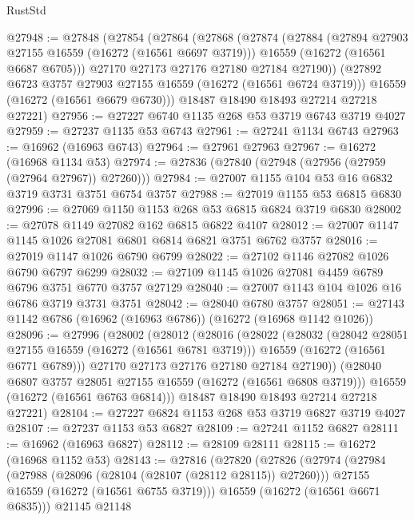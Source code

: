 \begin{lexlean}{RustStd}
\begin{coremodule}
@27948 := @27848
    (@27854
      (@27864
        (@27868
          (@27874
            (@27884
              (@27894 @27903 @27155 @16559 (@16272 (@16561 @6697 @3719)))
              @16559
              (@16272 (@16561 @6687 @6705)))
            @27170
            @27173
            @27176
            @27180
            @27184
            @27190))
        (@27892 @6723 @3757 @27903 @27155 @16559 (@16272 (@16561 @6724 @3719)))
        @16559
        (@16272 (@16561 @6679 @6730)))
      @18487
      @18490
      @18493
      @27214
      @27218
      @27221)
@27956 := @27227 @6740 @1135 @268 @53 @3719 @6743 @3719 @4027
@27959 := @27237 @1135 @53 @6743
@27961 := @27241 @1134 @6743
@27963 := @16962 (@16963 @6743)
@27964 := @27961 @27963
@27967 := @16272 (@16968 @1134 @53)
@27974 := @27836 (@27840 (@27948 (@27956 (@27959 (@27964 @27967)) @27260)))
@27984 := @27007 @1155 @104 @53 @16 @6832 @3719 @3731 @3751 @6754 @3757
@27988 := @27019 @1155 @53 @6815 @6830
@27996 := @27069 @1150 @1153 @268 @53 @6815 @6824 @3719 @6830
@28002 := @27078 @1149 @27082 @162 @6815 @6822 @4107
@28012 := @27007 @1147 @1145 @1026 @27081 @6801 @6814 @6821 @3751 @6762 @3757
@28016 := @27019 @1147 @1026 @6790 @6799
@28022 := @27102 @1146 @27082 @1026 @6790 @6797 @6299
@28032 := @27109 @1145 @1026 @27081 @4459 @6789 @6796 @3751 @6770 @3757 @27129
@28040 := @27007 @1143 @104 @1026 @16 @6786 @3719 @3731 @3751
@28042 := @28040 @6780 @3757
@28051 := @27143 @1142 @6786 (@16962 (@16963 @6786)) (@16272 (@16968 @1142 @1026))
@28096 := @27996
    (@28002
      (@28012
        (@28016
          (@28022
            (@28032
              (@28042 @28051 @27155 @16559 (@16272 (@16561 @6781 @3719)))
              @16559
              (@16272 (@16561 @6771 @6789)))
            @27170
            @27173
            @27176
            @27180
            @27184
            @27190))
        (@28040 @6807 @3757 @28051 @27155 @16559 (@16272 (@16561 @6808 @3719)))
        @16559
        (@16272 (@16561 @6763 @6814)))
      @18487
      @18490
      @18493
      @27214
      @27218
      @27221)
@28104 := @27227 @6824 @1153 @268 @53 @3719 @6827 @3719 @4027
@28107 := @27237 @1153 @53 @6827
@28109 := @27241 @1152 @6827
@28111 := @16962 (@16963 @6827)
@28112 := @28109 @28111
@28115 := @16272 (@16968 @1152 @53)
@28143 := @27816
    (@27820
      (@27826
        (@27974
          (@27984
            (@27988 (@28096 (@28104 (@28107 (@28112 @28115)) @27260)))
            @27155
            @16559
            (@16272 (@16561 @6755 @3719)))
          @16559
          (@16272 (@16561 @6671 @6835)))
        @21145
        @21148

\end{coremodule}
\end{lexlean}
